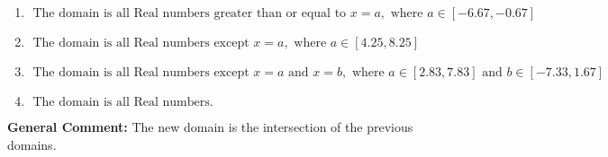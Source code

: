 \documentclass{extbook}[14pt]
\begin{document}
\begin{enumerate}
{\begin{enumerate}[label=\Alph*.]
\item \( \text{ The domain is all Real numbers greater than or equal to } x = a, \text{ where } a \in [-6.67, -0.67] \)


\item \( \text{ The domain is all Real numbers except } x = a, \text{ where } a \in [4.25, 8.25] \)


\item \( \text{ The domain is all Real numbers except } x = a \text{ and } x = b, \text{ where } a \in [2.83, 7.83] \text{ and } b \in [-7.33, 1.67] \)


\item \( \text{ The domain is all Real numbers. } \)


\end{enumerate}

\textbf{General Comment:} The new domain is the intersection of the previous domains.
}
\end{enumerate}
\end{document}

